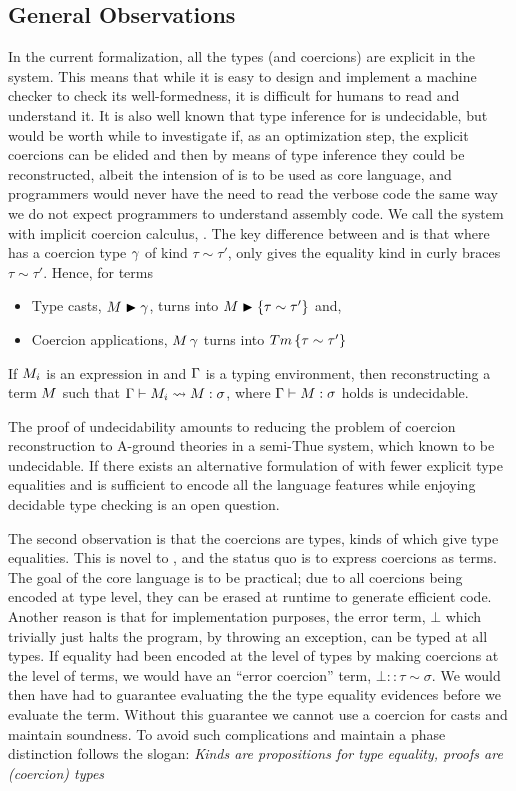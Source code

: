 \documentclass[screen,nonacm]{acmart}
\begin{document}
\subsection{General Observations}
In the current formalization, all the types (and coercions) are explicit in the system. This means that while it is easy to design and implement a machine checker to check its well-formedness, it is difficult for humans to read and understand it. It is also well known that type inference for \SF is undecidable\cite{wells_typability_1999}, but would be worth while to investigate if, as an optimization step, the explicit coercions can be elided and then by means of type inference they could be reconstructed, albeit the intension of \SFC is to be used as core language, and programmers would never have the need to read the verbose code the same way we do not expect programmers to understand assembly code. We call the system with implicit coercion calculus, \SFCi. The key difference between \SFC and \SFCi is that where \SFC has a coercion type $\gamma$ of kind $\tau\sim\tau'$, \SFCi only gives the equality kind in curly braces $\tau\sim\tau'$. Hence, for terms
\begin{itemize}
\item Type casts, $M\mathrel{\blacktriangleright}\gamma$, turns into $M\mathrel{\blacktriangleright}\{\tau \sim \tau'\}$ and,
\item Coercion applications, $M\,\gamma$ turns into $Tm\,\{\tau \sim \tau'\}$
\end{itemize}
\begin{theorem}
 If $M_i$ is an expression in \SFCi and $\Gamma$ is a typing environment, then reconstructing a \SFC term $M$ such that $\Gamma \vdash M_i \rightsquigarrow M : \sigma$, where $\Gamma \vdash M : \sigma$ holds is undecidable.
\end{theorem}
The proof of undecidability amounts to reducing the problem of coercion reconstruction to A-ground theories in a semi-Thue system, which known to be undecidable\cite{post_recursive_1947}. If there exists an alternative formulation of \SFCi with fewer explicit type equalities and is sufficient to encode all the language features while enjoying decidable type checking is an open question.

The second observation is that the coercions are types, kinds of which
give type equalities. This is novel to \SFC, and the status quo is to
express coercions as terms. The goal of the core language is to be
practical; due to all coercions being encoded at type level, they can
be erased at runtime to generate efficient code. Another reason is
that for implementation purposes, the error term, $\bot$ which
trivially just halts the program, by throwing an exception, can be
typed at all types. If equality had been encoded at the level of types
by making coercions at the level of terms, we would have an ``error
coercion'' term, $\bot :: \tau \sim \sigma$. We would then have had to
guarantee evaluating the the type equality evidences before we
evaluate the term. Without this guarantee we cannot use a coercion for
casts and maintain soundness. To avoid such complications and maintain
a phase distinction \SFC follows the slogan: \emph{Kinds are
  propositions for type equality, proofs are (coercion) types}
\end{document}
